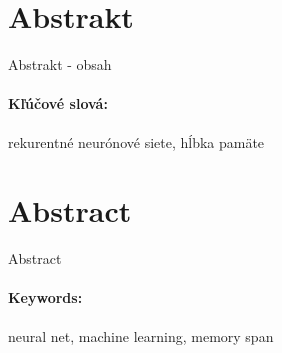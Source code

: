 \documentclass[12pt, oneside]{book}
\begin{document}
\section*{Abstrakt}

Abstrakt - obsah
 

\paragraph*{Kľúčové slová:} rekurentné neurónové siete, hĺbka pamäte


\newpage 
\section*{Abstract}

Abstract

\paragraph*{Keywords:} neural net, machine learning, memory span


%
%



\newpage 

\tableofcontents



\newpage 

\listoffigures


\mainmatter


 




\end{document}

